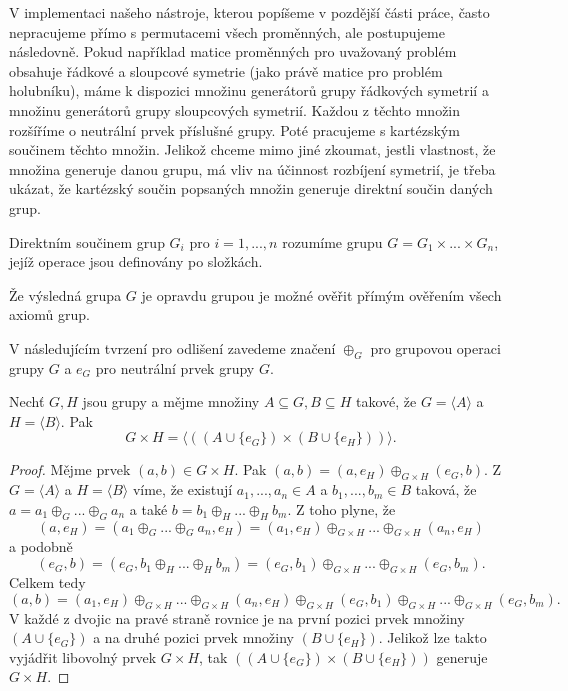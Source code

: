 V implementaci našeho nástroje, kterou popíšeme v pozdější části práce, často nepracujeme přímo s permutacemi všech proměnných, ale postupujeme následovně. Pokud například matice proměnných pro uvažovaný problém obsahuje řádkové a sloupcové symetrie (jako právě matice pro problém holubníku), máme k dispozici množinu generátorů grupy řádkových symetrií a množinu generátorů grupy sloupcových symetrií. Každou z těchto množin rozšíříme o neutrální prvek příslušné grupy. Poté pracujeme s kartézským součinem těchto množin. Jelikož chceme mimo jiné zkoumat, jestli vlastnost, že množina generuje danou grupu, má vliv na účinnost rozbíjení symetrií, je třeba ukázat, že kartézský součin popsaných množin generuje direktní součin daných grup.


\begin{definice}
Direktním součinem grup $G_i$ pro $i=1,...,n$ rozumíme grupu $G = G_1 \times ... \times G_n$, jejíž operace jsou definovány po složkách.
\end{definice}

Že výsledná grupa $G$ je opravdu grupou je možné ověřit přímým ověřením všech axiomů grup.

V následujícím tvrzení pro odlišení zavedeme značení $\oplus_G$ pro grupovou operaci grupy $G$ a $e_G$ pro neutrální prvek grupy $G$.

\begin{tvrz}
Nechť $G,H$ jsou grupy a mějme množiny $A \subseteq G, B\subseteq H$ takové, že $G=\langle A\rangle$ a $H=\langle B\rangle$. Pak $$G\times H=\langle ((A \cup \{e_G\}) \times (B \cup \{e_H\})) \rangle.$$
\end{tvrz}

\begin{proof}
Mějme prvek $(a,b)\in G\times H$. Pak $(a,b)=(a,e_H) \oplus_{G\times H} (e_G, b)$. Z $G=\langle A\rangle$ a $H=\langle B\rangle$ víme, že existují $a_1,...,a_n\in A$ a $b_1,...,b_m\in B$ taková, že $a = a_1 \oplus_G ... \oplus_G a_n$ a také $b= b_1 \oplus_H ... \oplus_H b_m$. Z toho plyne, že $$(a,e_H) = (a_1 \oplus_G ... \oplus_G a_n, e_H) = (a_1, e_H) \oplus_{G \times H} ... \oplus_{G \times H} (a_n, e_H)$$ a podobně $$(e_G, b) = (e_G, b_1 \oplus_H ... \oplus_H b_m) = (e_G, b_1) \oplus_{G\times H} ... \oplus_{G\times H} (e_G, b_m).$$ Celkem tedy $$(a,b)= (a_1, e_H) \oplus_{G \times H} ... \oplus_{G \times H} (a_n, e_H) \oplus_{G\times H} (e_G, b_1) \oplus_{G\times H} ... \oplus_{G\times H} (e_G, b_m).$$ V každé z dvojic na pravé straně rovnice je na první pozici prvek množiny $(A \cup \{e_G\})$ a na druhé pozici prvek množiny $(B \cup \{e_H\})$. Jelikož lze takto vyjádřit libovolný prvek $G\times H$, tak $((A \cup \{e_G\}) \times (B \cup \{e_H\}))$ generuje $G\times H$.
\end{proof}

